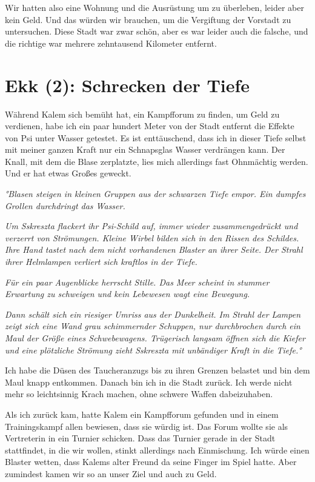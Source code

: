 \documentclass[11pt]{article}
\begin{document}
Wir hatten also eine Wohnung und die Ausrüstung um zu überleben, leider
aber kein Geld. Und das würden wir brauchen, um die Vergiftung der
Vorstadt zu untersuchen. Diese Stadt war zwar schön, aber es war leider
auch die falsche, und die richtige war mehrere zehntausend Kilometer
entfernt.

\section{Ekk (2): Schrecken der Tiefe}

Während Kalem sich bemüht hat, ein Kampfforum zu finden, um Geld zu
verdienen, habe ich ein paar hundert Meter von der Stadt entfernt die
Effekte von Psi unter Wasser getestet. Es ist enttäuschend, dass ich in
dieser Tiefe selbst mit meiner ganzen Kraft nur ein Schnapsglas Wasser
verdrängen kann. Der Knall, mit dem die Blase zerplatzte, lies mich
allerdings fast Ohnmächtig werden. Und er hat etwas Großes geweckt.

\emph{°Blasen steigen in kleinen Gruppen aus der schwarzen Tiefe empor.
Ein dumpfes Grollen durchdringt das Wasser.}

\emph{Um Sskreszta flackert ihr Psi-Schild auf, immer wieder
zusammengedrückt und verzerrt von Strömungen. Kleine Wirbel bilden sich
in den Rissen des Schildes. Ihre Hand tastet nach dem nicht vorhandenen
Blaster an ihrer Seite. Der Strahl ihrer Helmlampen verliert sich
kraftlos in der Tiefe.}

\emph{Für ein paar Augenblicke herrscht Stille. Das Meer scheint in
stummer Erwartung zu schweigen und kein Lebewesen wagt eine Bewegung.}

\emph{Dann schält sich ein riesiger Umriss aus der Dunkelheit. Im Strahl
der Lampen zeigt sich eine Wand grau schimmernder Schuppen, nur
durchbrochen durch ein Maul der Größe eines Schwebewagens. Trügerisch
langsam öffnen sich die Kiefer und eine plötzliche Strömung zieht
Sskreszta mit unbändiger Kraft in die Tiefe.°}

Ich habe die Düsen des Taucheranzugs bis zu ihren Grenzen belastet und
bin dem Maul knapp entkommen. Danach bin ich in die Stadt zurück. Ich
werde nicht mehr so leichtsinnig Krach machen, ohne schwere Waffen
dabeizuhaben.

Als ich zurück kam, hatte Kalem ein Kampfforum gefunden und in einem
Trainingskampf allen bewiesen, dass sie würdig ist. Das Forum wollte sie
als Vertreterin in ein Turnier schicken. Dass das Turnier gerade in der
Stadt stattfindet, in die wir wollen, stinkt allerdings nach
Einmischung. Ich würde einen Blaster wetten, dass Kalems alter Freund da
seine Finger im Spiel hatte. Aber zumindest kamen wir so an unser Ziel
und auch zu Geld.
\end{document}
